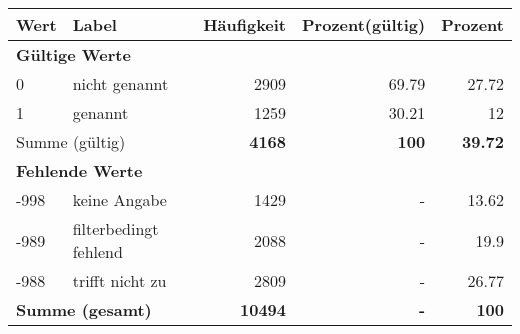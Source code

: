      \begin{longtable}{lXrrr}
     \toprule
     \textbf{Wert} & \textbf{Label} & \textbf{Häufigkeit} & \textbf{Prozent(gültig)} & \textbf{Prozent} \\
     \endhead
     \midrule
     \multicolumn{5}{l}{\textbf{Gültige Werte}}\\

     0 &
     \multicolumn{1}{X}{ nicht genannt   } &


       \num{2909} &
       \num[round-mode=places,round-precision=2]{69,79} &
         \num[round-mode=places,round-precision=2]{27,72} \\

     1 &
     \multicolumn{1}{X}{ genannt   } &


       \num{1259} &
       \num[round-mode=places,round-precision=2]{30,21} &
         \num[round-mode=places,round-precision=2]{12} \\
     \midrule
     \multicolumn{2}{l}{Summe (gültig)} &
       \textbf{\num{4168}} &
     \textbf{100} &
       \textbf{\num[round-mode=places,round-precision=2]{39,72}} \\
     \multicolumn{5}{l}{\textbf{Fehlende Werte}}\\
       -998 &
       keine Angabe &
         \num{1429} &
        - &
         \num[round-mode=places,round-precision=2]{13,62} \\
       -989 &
       filterbedingt fehlend &
         \num{2088} &
        - &
         \num[round-mode=places,round-precision=2]{19,9} \\
       -988 &
       trifft nicht zu &
         \num{2809} &
        - &
         \num[round-mode=places,round-precision=2]{26,77} \\
     \midrule
     \multicolumn{2}{l}{\textbf{Summe (gesamt)}} &
          \textbf{\num{10494}} &
        \textbf{-} &
        \textbf{100} \\
     \bottomrule
     \end{longtable}
     
